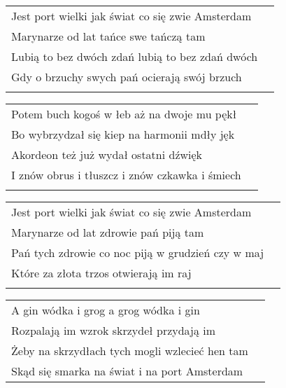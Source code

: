 \documentclass[a5paper]{article}
\begin{document}
\noindent
\begin{tabular}{@{}p{8.00cm}p{3cm}@{}}
Jest port wielki jak świat co się zwie Amsterdam\\
Marynarze od lat tańce swe tańczą tam\\
Lubią to bez dwóch zdań lubią to bez zdań dwóch\\
Gdy o brzuchy swych pań ocierają swój brzuch\\\\
\end{tabular}

\noindent
\begin{tabular}{@{}p{8.00cm}p{3cm}@{}}
Potem buch kogoś w łeb aż na dwoje mu pękł\\
Bo wybrzydzał się kiep na harmonii mdły jęk\\
Akordeon też już wydał ostatni dźwięk\\
I znów obrus i tłuszcz i znów czkawka i śmiech\\\\
\end{tabular}

\noindent
\begin{tabular}{@{}p{8.00cm}p{3cm}@{}}
Jest port wielki jak świat co się zwie Amsterdam\\
Marynarze od lat zdrowie pań piją tam\\
Pań tych zdrowie co noc piją w grudzień czy w maj\\
Które za złota trzos otwierają im raj\\\\
\end{tabular}

\noindent
\begin{tabular}{@{}p{8.00cm}p{3cm}@{}}
A gin wódka i grog a grog wódka i gin\\
Rozpalają im wzrok skrzydeł przydają im\\
Żeby na skrzydłach tych mogli wzlecieć hen tam\\
Skąd się smarka na świat i na port Amsterdam
\end{tabular}
\end{document}
